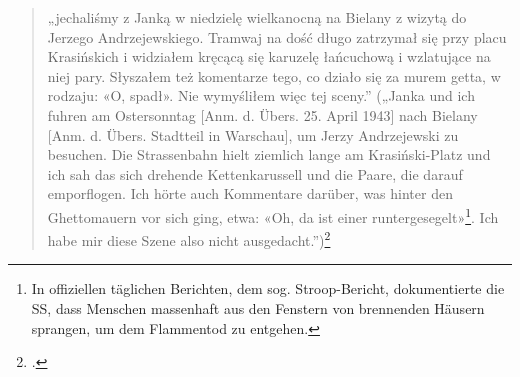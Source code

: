 \begin{quote}
  „jechaliśmy z Janką w niedzielę wielkanocną na Bielany z wizytą do Jerzego Andrzejewskiego. Tramwaj na dość długo zatrzymał się przy placu Krasińskich i widziałem kręcącą się karuzelę łańcuchową i wzlatujące na niej pary. Słyszałem też komentarze tego, co działo się za murem getta, w rodzaju: «O, spadł». Nie wymyśliłem więc tej sceny.” („Janka und ich fuhren am Ostersonntag [Anm. d. Übers. 25. April 1943] nach Bielany [Anm. d. Übers. Stadtteil in Warschau], um Jerzy Andrzejewski zu besuchen. Die Strassenbahn hielt ziemlich lange am Krasiński-Platz und ich sah das sich drehende Kettenkarussell und die Paare, die darauf emporflogen. Ich hörte auch Kommentare darüber, was hinter den Ghettomauern vor sich ging, etwa: «Oh, da ist einer runtergesegelt»\footnote{In offiziellen täglichen Berichten, dem sog. Stroop-Bericht, dokumentierte die SS, dass Menschen massenhaft aus den Fenstern von brennenden Häusern sprangen, um dem Flammentod zu entgehen.}. Ich habe mir diese Szene also nicht ausgedacht.”)\footcite[eigene Übersetzung.][]{karuzela-2003}
\end{quote}

